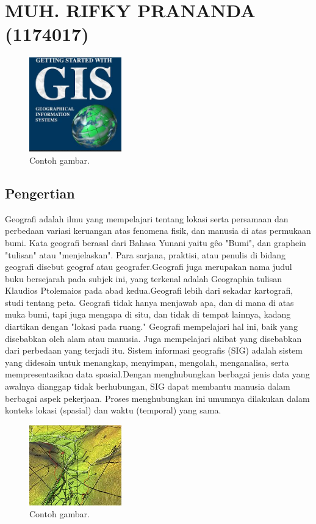 \section{MUH. RIFKY PRANANDA (1174017)}
\begin{figure}[H]
	\includegraphics[width=4cm]{figures/1174017/gis1.JPG}
	\centering
	\caption{Contoh gambar.}
\end{figure}
\subsection{Pengertian}
Geografi adalah ilmu yang mempelajari tentang lokasi serta persamaan dan perbedaan variasi keruangan atas fenomena fisik, dan manusia di atas permukaan bumi. Kata geografi berasal dari Bahasa Yunani yaitu gêo "Bumi", dan graphein "tulisan" atau "menjelaskan". Para sarjana, praktisi, atau penulis di bidang geografi disebut geograf atau geografer.Geografi juga merupakan nama judul buku bersejarah pada subjek ini, yang terkenal adalah Geographia tulisan Klaudios Ptolemaios pada abad kedua.Geografi lebih dari sekadar kartografi, studi tentang peta. Geografi tidak hanya menjawab apa, dan di mana di atas muka bumi, tapi juga mengapa di situ, dan tidak di tempat lainnya, kadang diartikan dengan "lokasi pada ruang." Geografi mempelajari hal ini, baik yang disebabkan oleh alam atau manusia. Juga mempelajari akibat yang disebabkan dari perbedaan yang terjadi itu.
Sistem informasi geografis (SIG) adalah sistem yang didesain untuk menangkap, menyimpan, mengolah, menganalisa, serta mempresentasikan data spasial.Dengan menghubungkan berbagai jenis data yang awalnya dianggap tidak berhubungan, SIG dapat membantu manusia dalam berbagai aspek pekerjaan. Proses menghubungkan ini umumnya dilakukan dalam konteks lokasi (spasial) dan waktu (temporal) yang sama.
\begin{figure}[H]
	\includegraphics[width=4cm]{figures/1174017/gis.JPG}
	\centering
	\caption{Contoh gambar.}
\end{figure}
